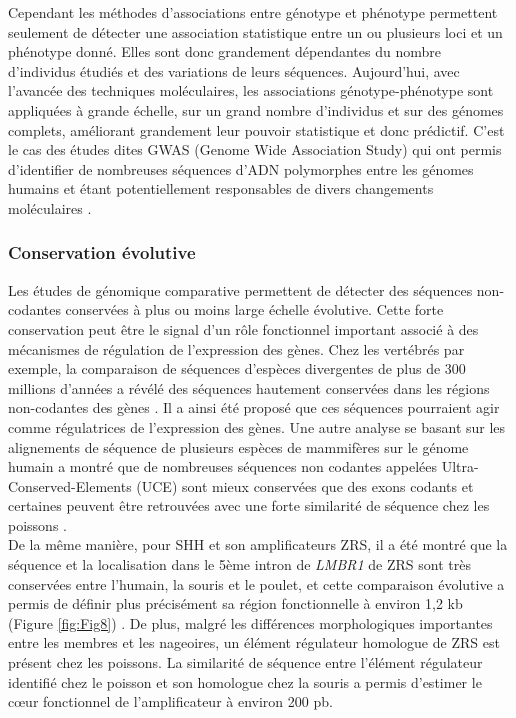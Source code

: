 Cependant les méthodes d'associations entre génotype et phénotype permettent seulement de détecter une association statistique entre un ou plusieurs loci et un phénotype donné. Elles sont donc grandement dépendantes du nombre d'individus étudiés et des variations de leurs séquences. Aujourd’hui, avec l’avancée des techniques moléculaires, les associations génotype-phénotype sont appliquées à grande échelle, sur un grand nombre d'individus et sur des génomes complets, améliorant grandement leur pouvoir statistique et donc prédictif. C’est le cas des études dites GWAS (Genome Wide Association Study) qui ont permis d’identifier de nombreuses séquences d’ADN polymorphes entre les génomes humains et étant potentiellement responsables de divers changements moléculaires \citep{lappalainen_evolutionary_2010, bryois_cis_2014}.

\subsubsection{Conservation évolutive}
\label{subsubsec:conserv-evol}

Les études de génomique comparative permettent de détecter des séquences non-codantes conservées à plus ou moins large échelle évolutive. Cette forte conservation peut être le signal d’un rôle fonctionnel important associé à des mécanismes de régulation de l’expression des gènes. Chez les vertébrés par exemple, la comparaison de séquences d’espèces divergentes de plus de 300 millions d’années a révélé des séquences hautement conservées dans les régions non-codantes des gènes \citep{duret_strong_1993}. Il a ainsi été proposé que ces séquences pourraient agir comme régulatrices de l’expression des gènes. Une autre analyse se basant sur les alignements de séquence de plusieurs espèces de mammifères sur le génome humain a montré que de nombreuses séquences non codantes appelées Ultra-Conserved-Elements (UCE) sont mieux conservées que des exons codants et certaines peuvent être retrouvées avec une forte similarité de séquence chez les poissons \citep{bejerano_ultraconserved_2004}. \\

De la même manière, pour \acrshort{SHH} et son \glspl{amplificateur} \acrshort{ZRS}, il a été montré que la séquence et la localisation dans le 5ème intron de \textit{LMBR1} de \acrshort{ZRS} sont très conservées entre l’humain, la souris et le poulet, et cette comparaison évolutive a permis de définir plus précisément sa région fonctionnelle à environ 1,2 kb (Figure \ref{fig:Fig8}) \citep{lettice_long-range_2003, sagai_elimination_2005}. De plus, malgré les différences morphologiques importantes entre les membres et les nageoires, un élément régulateur homologue de \acrshort{ZRS} est présent chez les poissons. La similarité de séquence entre l’élément régulateur identifié chez le poisson et son homologue chez la souris a permis d’estimer le cœur fonctionnel de l’\gls{amplificateur} à environ 200 pb.

